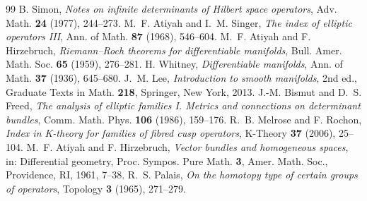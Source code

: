 \begin{thebibliography}{99}
 B. Simon, \emph{Notes on infinite determinants of Hilbert space operators}, Adv. Math. \textbf{24} (1977), 244--273.
 M.~F. Atiyah and I.~M. Singer, \emph{The index of elliptic operators III}, Ann. of Math. \textbf{87} (1968), 546--604.
 M.~F. Atiyah and F. Hirzebruch, \emph{Riemann--Roch theorems for differentiable manifolds}, Bull. Amer. Math. Soc. \textbf{65} (1959), 276--281.
 H. Whitney, \emph{Differentiable manifolds}, Ann. of Math. \textbf{37} (1936), 645--680.
 J.~M. Lee, \emph{Introduction to smooth manifolds}, 2nd ed., Graduate Texts in Math. \textbf{218}, Springer, New York, 2013.
 J.-M. Bismut and D.~S. Freed, \emph{The analysis of elliptic families I. Metrics and connections on determinant bundles}, Comm. Math. Phys. \textbf{106} (1986), 159--176.
 R.~B. Melrose and F. Rochon, \emph{Index in K-theory for families of fibred cusp operators}, K-Theory \textbf{37} (2006), 25--104.
 M.~F. Atiyah and F. Hirzebruch, \emph{Vector bundles and homogeneous spaces}, in: Differential geometry, Proc. Sympos. Pure Math. \textbf{3}, Amer. Math. Soc., Providence, RI, 1961, 7--38.
 R.~S. Palais, \emph{On the homotopy type of certain groups of operators}, Topology \textbf{3} (1965), 271--279.
\end{thebibliography}
